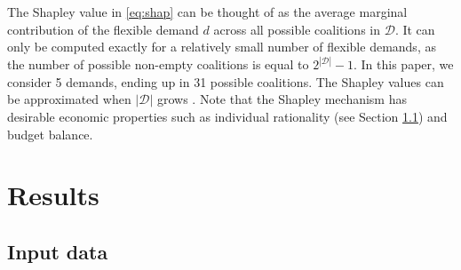 \documentclass[conference]{IEEEtran}
\begin{document}

The Shapley value  in \eqref{eq:shap} can be thought of as the average marginal contribution of the flexible demand $d$ across all possible coalitions in $\mathcal{D}$. It can only be computed exactly for a relatively small number of flexible demands, as the number of  possible non-empty coalitions is equal to $2^{|\mathcal{D}|} - 1$. In this paper, we consider 5 demands, ending up in 31 possible coalitions. The Shapley values can be approximated when $|\mathcal{D}|$ grows \cite{castro2009polynomial}.
Note that the Shapley mechanism has desirable economic properties such as individual rationality (see Section \ref{chapter3}) and budget balance.




\section{Results}\label{chapter3}

\subsection{Input data}\label{chapter3}
\end{document}
